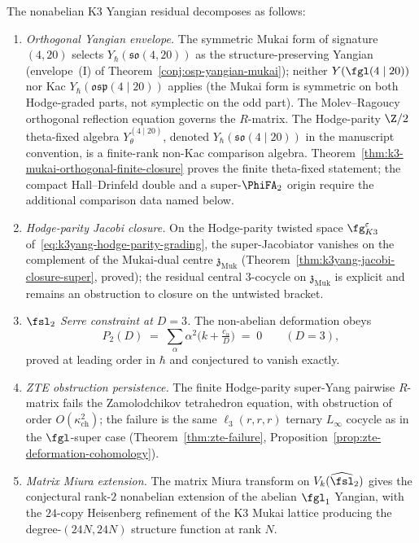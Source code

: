 \begin{theorem}
\label{conj:nonabelian-k3-yangian-programme}
The nonabelian K3 Yangian residual decomposes as follows:
\begin{enumerate}[label=\textup{(N\arabic*)}]
 \item \emph{Orthogonal Yangian envelope.} The symmetric Mukai form of signature $(4, 20)$ selects \(Y_\hbar(\mathfrak{so}(4, 20))\) as the structure-preserving Yangian (envelope~(I) of Theorem~\ref{conj:osp-yangian-mukai}); neither \(Y(\fgl(4 \mid 20))\) nor Kac \(Y_\hbar(\mathfrak{osp}(4 \mid 20))\) applies (the Mukai form is symmetric on both Hodge-graded parts, not symplectic on the odd part). The Molev--Ragoucy orthogonal reflection equation governs the \(R\)-matrix. The Hodge-parity \(\Z/2\) theta-fixed algebra \(Y_\theta^{(4\mid20)}\), denoted \(Y_\hbar(\mathfrak{so}(4 \mid 20))\) in the manuscript convention, is a finite-rank non-Kac comparison algebra. Theorem~\ref{thm:k3-mukai-orthogonal-finite-closure} proves the finite theta-fixed statement; the compact Hall--Drinfeld double and a super-\(\PhiFA_2\) origin require the additional comparison data named below.
 \item \emph{Hodge-parity Jacobi closure.} On the Hodge-parity twisted space $\fg^{\varepsilon}_{K3}$ of~\eqref{eq:k3yang-hodge-parity-grading}, the super-Jacobiator vanishes on the complement of the Mukai-dual centre $\mathfrak z_{\mathrm{Muk}}$ (Theorem~\ref{thm:k3yang-jacobi-closure-super}, proved); the residual central $3$-cocycle on $\mathfrak z_{\mathrm{Muk}}$ is explicit and remains an obstruction to closure on the untwisted bracket.
 \item \emph{$\fsl_2$ Serre constraint at $D = 3$.} The non-abelian deformation obeys
 \[
 P_2(D) \;=\; \sum_\alpha \alpha^2 \bigl(k + \tfrac{c_\alpha}{D}\bigr) \;=\; 0 \qquad (D = 3),
 \]
 proved at leading order in $\hbar$ and conjectured to vanish exactly.
 \item \emph{ZTE obstruction persistence.} The finite Hodge-parity
 super-Yang pairwise $R$-matrix fails the Zamolodchikov tetrahedron
 equation, with obstruction of order $O(\kappa_{\mathrm{ch}}^2)$; the
 failure is the same $\ell_3(r,r,r)$ ternary $L_\infty$ cocycle as in
 the $\fgl$-super case (Theorem~\ref{thm:zte-failure},
 Proposition~\ref{prop:zte-deformation-cohomology}).
 \item \emph{Matrix Miura extension.} The matrix Miura transform on $V_k(\widehat{\fsl}_2)$ gives the conjectural rank-$2$ nonabelian extension of the abelian $\fgl_1$ Yangian, with the $24$-copy Heisenberg refinement of the K3 Mukai lattice producing the degree-$(24N, 24N)$ structure function at rank $N$.

\end{enumerate}
\end{theorem}
